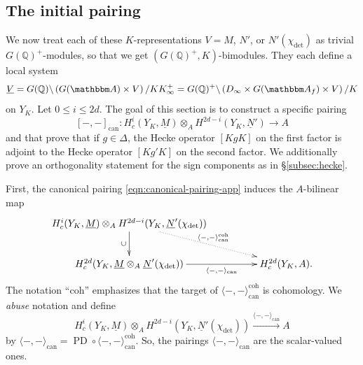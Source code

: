 \documentclass[10pt, twoside]{amsart}
\theoremstyle{plain}
\theoremstyle{definition}
\theoremstyle{remark}
\numberwithin{equation}{subsection}
\def\Q{\mathbb Q}
\def\A{\mathbbm A}
\def\can{\mathrm{can}}
\def\PD{\operatorname{PD}}
\def\can{\mathrm{can}}
\newcommand{\coh}{\mathrm{coh}}
\begin{document}
\begin{appendix}
\subsection{The initial pairing}

We now treat each of these $K$-representations $V=M$, $N'$, or $N'(\chi_{\det})$ as trivial $G(\Q)^+$-modules, so that we get $(G(\Q)^+,K)$-bimodules.  They each define a local system
$$
\underline V = G(\Q)\backslash \left(G(\A) \times V\right) / K K_\infty^+ = G(\Q)^+\backslash \left( D_\infty \times G(\A_f) \times V\right)/K
$$
on $Y_K$. Let $0 \leq i \leq 2d$. The goal of this section is to construct a specific pairing
\begin{equation}\label{eqn:app-canonical-pairing}
[-,-]_{\can} : H^i_c(Y_K,\underline M) \otimes_A H^{2d-i}(Y_K,\underline N') \rightarrow A
\end{equation}
and that prove that if $g \in \Delta$, the Hecke operator $[KgK]$ on the first factor is adjoint to the Hecke operator $[Kg'K]$ on the second factor. We additionally prove an orthogonality statement for the sign components as in \S \ref{subsec:hecke}.

First, the canonical pairing \eqref{eqn:canonical-pairing-app} induces the $A$-bilinear map
\begin{equation*}
\xymatrixcolsep{4pc}
\xymatrix{
H^i_c(Y_K,\underline M)\otimes_A H^{2d-i}(Y_K,\underline N'(\chi_{\det})) \ar@{.>}[dr]^-{\langle - , - \rangle_{\can}^{\coh}} \ar[d]_-{\cup}\\
H^{2d}_c(Y_K, \underline M \otimes_A \underline N'(\chi_{\det})) \ar[r]_-{\langle - , - \rangle_{\can}}
 & H^{2d}_c(Y_K,A).
 }
\end{equation*}
The notation ``$\coh$'' emphasizes that the target of $\langle - , - \rangle_{\can}^{\coh}$ is cohomology. We {\em abuse} notation and define
$$
H^i_c(Y_K,\underline M)\otimes_A H^{2d-i}(Y_K,\underline N'(\chi_{\det})) \xrightarrow{\langle - , - \rangle_{\can}} A
$$
by $\langle - , - \rangle_{\can} = \PD \circ \langle - , - \rangle_{\can}^{\coh}$. So, the pairings $\langle - , - \rangle_{\can}$ are the scalar-valued ones.


\end{appendix}
\end{document}
